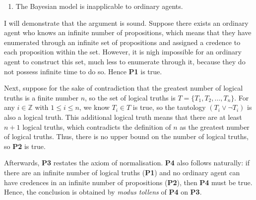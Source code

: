 \documentclass[12pt]{article}
\begin{document}
\begin{enumerate}[resume,label=\textbf{C:}, topsep=0pt, leftmargin=0.5in]
    \item The Bayesian model is inapplicable to ordinary agents.
\end{enumerate}

I will demonstrate that the argument is sound. Suppose there exists an ordinary agent who knows an infinite number of propositions, which means that they have enumerated through an infinite set of propositions and assigned a credence to each proposition within the set. However, it is nigh impossible for an ordinary agent to construct this set, much less to enumerate through it, because they do not possess infinite time to do so. Hence \textbf{P1} is true.

Next, suppose for the sake of contradiction that the greatest number of logical truths is a finite number $n$, so the set of logical truths is $T=\{T_1,T_2,\dots,T_n\}$. For any $i\in\mathbb{Z}$ with $1\leq i\leq n$, we know $T_i\in T$ is true, so the tautology $(T_i\lor\lnot T_i)$ is also a logical truth. This additional logical truth means that there are at least $n+1$ logical truths, which contradicts the definition of $n$ as the greatest number of logical truths. Thus, there is no upper bound on the number of logical truths, so \textbf{P2} is true.

Afterwards, \textbf{P3} restates the axiom of normalisation. \textbf{P4} also follows naturally: if there are an infinite number of logical truths (\textbf{P1}) and no ordinary agent can have credences in an infinite number of propositions (\textbf{P2}), then \textbf{P4} must be true. Hence, the conclusion is obtained by \textit{modus tollens} of \textbf{P4} on \textbf{P3}.
\end{document}
